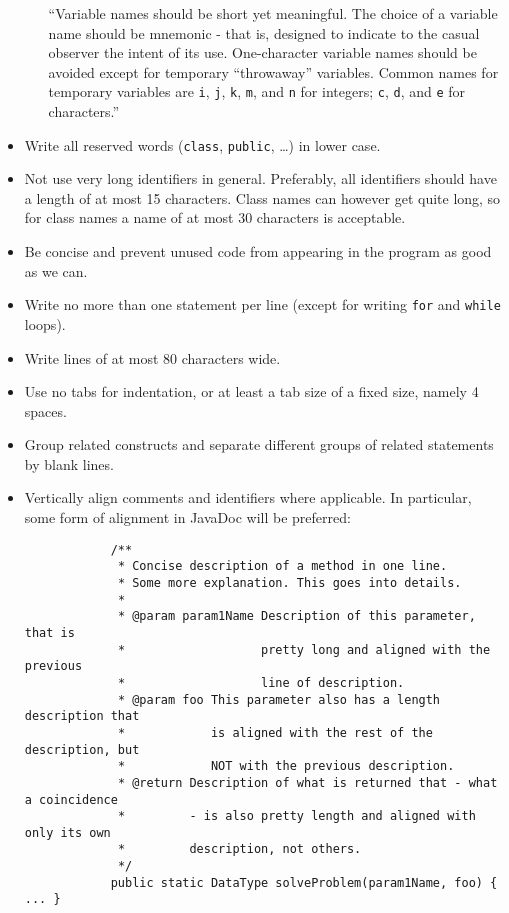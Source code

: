 \begin{itemize}
\begin{itemize}
			``Variable names should be short yet meaningful. The choice of a variable name should be mnemonic - that is, designed to indicate to the casual observer the intent of its use. One-character variable names should be avoided except for temporary “throwaway” variables. Common names for temporary variables are \texttt{i}, \texttt{j}, \texttt{k}, \texttt{m}, and \texttt{n} for integers; \texttt{c}, \texttt{d}, and \texttt{e} for characters.''
		\end{itemize}
	\item Write all reserved words (\texttt{class}, \texttt{public}, \dots) in lower case.
	\item Not use very long identifiers in general. Preferably, all identifiers should have a length of at most 15 characters. Class names can however get quite long, so for class names a name of at most 30 characters is acceptable.
	\item Be concise and prevent unused code from appearing in the program as good as we can.
	\item Write no more than one statement per line (except for writing \texttt{for} and \texttt{while} loops).
	\item Write lines of at most 80 characters wide.
	\item Use no tabs for indentation, or at least a tab size of a fixed size, namely 4 spaces.
	\item Group related constructs and separate different groups of related statements by blank lines.
	\item Vertically align comments and identifiers where applicable. In particular, some form of alignment in JavaDoc will be preferred:
		\begin{center}\begin{verbatim}
			/**
			 * Concise description of a method in one line.
			 * Some more explanation. This goes into details.
			 *
			 * @param param1Name Description of this parameter, that is
			 *                   pretty long and aligned with the previous
			 *                   line of description.
			 * @param foo This parameter also has a length description that
			 *            is aligned with the rest of the description, but
			 *            NOT with the previous description.
			 * @return Description of what is returned that - what a coincidence
			 *         - is also pretty length and aligned with only its own
			 *         description, not others.
			 */
			public static DataType solveProblem(param1Name, foo) { ... }
		\end{verbatim}\end{center}
\end{itemize}

